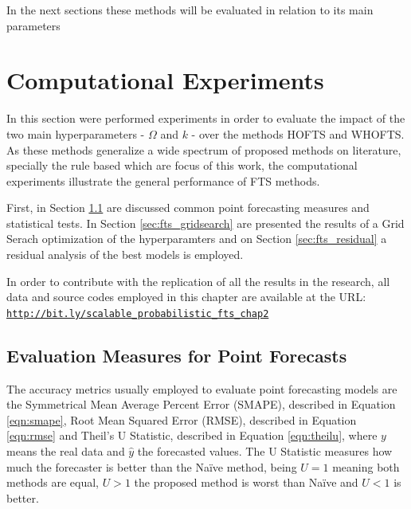 In the next sections these methods will be evaluated in relation to its main parameters 

%
\section{Computational Experiments}
\label{sec:fts_experiments}

In this section were performed experiments in order to evaluate the impact of the two main hyperparameters - $\Omega$ and $k$ - over the methods HOFTS and WHOFTS. As these methods generalize a wide spectrum of proposed methods on literature, specially the rule based which are focus of this work, the computational experiments illustrate the general performance of FTS methods.

First, in Section \ref{sec:point_measures} are discussed common point forecasting measures and statistical tests. In Section \ref{sec:fts_gridsearch} are presented the results of a Grid Serach optimization of the hyperparamters and on Section \ref{sec:fts_residual} a residual analysis of the best models is employed.

In order to contribute with the replication of all the results in the research, all data and source codes employed in this chapter are available at the URL:
\texttt{\url{http://bit.ly/scalable_probabilistic_fts_chap2}}

%
\subsection{Evaluation Measures for Point Forecasts}
\label{sec:point_measures}


The accuracy metrics usually employed to evaluate point forecasting models are the Symmetrical Mean Average Percent Error (SMAPE), described in Equation \eqref{eqn:smape}, Root Mean Squared Error (RMSE), described in Equation \eqref{eqn:rmse} and Theil's U Statistic, described in Equation \eqref{eqn:theilu},  where $y$ means the real data and $\hat{y}$ the forecasted values. The U Statistic measures how much the forecaster is better than the Na\"{i}ve method, being $U = 1$ meaning both methods are equal, $U > 1$ the proposed method is worst than Na\"{i}ve and $U < 1$ is better.  

